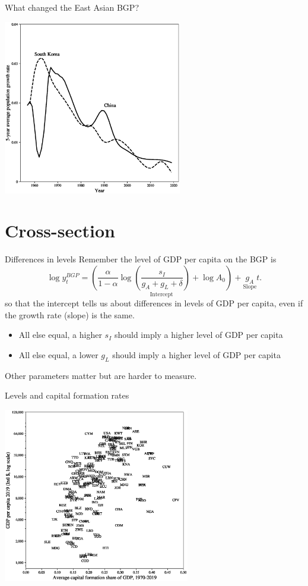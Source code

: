\begin{frame}{What changed the East Asian BGP?}
\begin{center}
\includegraphics[height = 3in]{../Figures/fig-ch3-fig4.eps}
\end{center}
\end{frame}

\section{Cross-section}
\begin{frame}{Differences in levels}
Remember the level of GDP per capita on the BGP is
\begin{equation}
	\log y_t^{BGP} = \underset{\text{Intercept}}{\left(\frac{\alpha}{1-\alpha} \log \left(\frac{s_I}{g_A + g_L + \delta} \right) + \log A_0\right)} + \underset{\text{Slope}}{g_A} t. \nonumber
\end{equation}
so that the intercept tells us about differences in levels of GDP per capita, even if the growth rate (slope) is the same.
\begin{itemize}
	\item All else equal, a higher $s_I$ should imply a higher level of GDP per capita
	\item All else equal, a lower $g_L$ should imply a higher level of GDP per capita
\end{itemize}
Other parameters matter but are harder to measure.
\end{frame}

\begin{frame}{Levels and capital formation rates}
\begin{center}
\includegraphics[height = 3in]{../Figures/fig-ch3-fig5.eps}
\end{center}
\end{frame}

